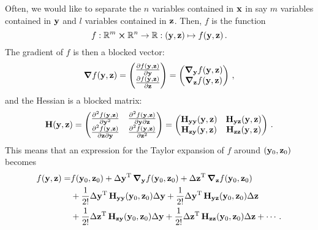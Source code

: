         Often, we would like to separate the $n$ variables contained in $\vb{x}$ in say $m$ variables contained in $\vb{y}$ and $l$ variables contained in $\vb{z}$. Then, $f$ is the function
        \begin{equation}
            f: \mathbb{R}^m \cross \mathbb{R}^n \rightarrow \mathbb{R}: (\vb{y}, \vb{z}) \mapsto f(\vb{y}, \vb{z}) \thinspace .
        \end{equation}
        The gradient of $f$ is then a blocked vector:
        \begin{equation}
            \grad{f(\vb{y}, \vb{z})} =
            \begin{pmatrix}
                \pdv{f(\vb{y}, \vb{z})}{\vb{y}} \\
                \pdv{f(\vb{y}, \vb{z})}{\vb{z}}
            \end{pmatrix} =
            \begin{pmatrix}
                \grad_{\vb{y}}{f(\vb{y}, \vb{z})} \\
                \grad_{\vb{z}}{f(\vb{y}, \vb{z})}
            \end{pmatrix}
            \thinspace ,
        \end{equation}
        and the Hessian is a blocked matrix:
        \begin{equation}
            \vb{H}(\vb{y}, \vb{z}) =
            \begin{pmatrix}
                \pdv[2]{f(\vb{y}, \vb{z})}{\vb{y}} & \pdv{f(\vb{y}, \vb{z})}{\vb{y}}{\vb{z}} \\
                \pdv{f(\vb{y}, \vb{z})}{\vb{z}}{\vb{y}} & \pdv[2]{f(\vb{y}, \vb{z})}{\vb{z}}
            \end{pmatrix}
            =
            \begin{pmatrix}
                \vb{H}_{\vb{y} \vb{y}}(\vb{y}, \vb{z}) & \vb{H}_{\vb{y} \vb{z}}(\vb{y}, \vb{z}) \\
                \vb{H}_{\vb{z} \vb{y}}(\vb{y}, \vb{z}) & \vb{H}_{\vb{z} \vb{z}}(\vb{y}, \vb{z})
            \end{pmatrix} \thinspace .
        \end{equation}
        This means that an expression for the Taylor expansion of $f$ around $(\vb{y}_0, \vb{z}_0)$ becomes
        \begin{equation}
            \begin{split}
                f(\vb{y}, \vb{z}) = &f(\vb{y}_0, \vb{z}_0) + \Delta \vb{y}^\text{T} \thinspace \grad_{\vb{y}}{f(\vb{y}_0, \vb{z}_0)} + \Delta \vb{z}^\text{T} \thinspace \grad_{\vb{z}}{f(\vb{y}_0, \vb{z}_0)} \\
                &+ \frac{1}{2!} \Delta \vb{y}^\text{T} \thinspace \vb{H}_{\vb{y} \vb{y}}(\vb{y}_0, \vb{z}_0) \Delta \vb{y} + \frac{1}{2!} \Delta \vb{y}^\text{T} \thinspace \vb{H}_{\vb{y} \vb{z}}(\vb{y}_0, \vb{z}_0) \Delta \vb{z} \\
                &+ \frac{1}{2!} \Delta \vb{z}^\text{T} \thinspace \vb{H}_{\vb{z} \vb{y}}(\vb{y}_0, \vb{z}_0) \Delta \vb{y} + \frac{1}{2!} \Delta \vb{z}^\text{T} \thinspace \vb{H}_{\vb{z} \vb{z}}(\vb{y}_0, \vb{z}_0) \Delta \vb{z} + \cdots \thinspace .
            \end{split}
        \end{equation}

